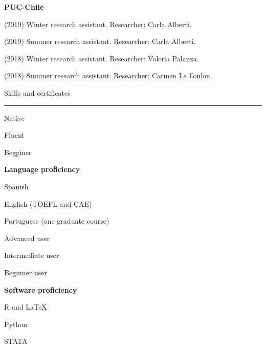 \documentclass[a4paper, 12pt]{article}
\begin{document}
\begin{multicols}{2}

\textbf{PUC-Chile}

\columnbreak

\begin{flushright}

(2019) Winter research assistant. Researcher: Carla Alberti.

(2019) Summer research assistant. Researcher: Carla Alberti.

(2018) Winter research assistant. Researcher: Valeria Palanza.

(2018) Summer research assistant. Researcher: Carmen Le Foulon.

\end{flushright}

\end{multicols}





\large Skills and certificates

\smallskip

\hrule

\normalsize

\begin{multicols}{2}

\hfill

Native

Fluent

Begginer

\columnbreak

\begin{flushright}

\textbf{Language proficiency}

\medskip

Spanish

English (TOEFL and CAE)

Portuguese (one graduate course)

\end{flushright}

\end{multicols}

\begin{multicols}{2}

\hfill

Advanced user

Intermediate user

Beginner user

\columnbreak

\begin{flushright}

\textbf{Software proficiency}

\medskip

\textsf{R} and \LaTeX

\textsf{Python}

\textsf{STATA}

\end{flushright}

\end{multicols}
\end{document}
